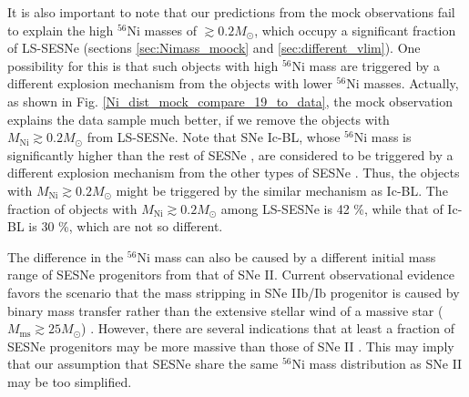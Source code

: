 \documentclass[twocolumn, linenumbers]{aastex62}
\begin{document}
It is also important to note that our predictions from the mock observations fail to explain the high $^{56}$Ni masses of $\gtrsim 0.2 M_{\odot}$, which occupy a significant fraction of LS-SESNe (sections \ref{sec:Nimass_moock} and \ref{sec:different_vlim}).
One possibility for this is that such objects with high $^{56}$Ni mass are triggered by a different explosion mechanism from the objects with lower $^{56}$Ni masses. Actually, as shown in Fig. \ref{Ni_dist_mock_compare_19_to_data}, the mock observation explains the data sample much better, if we remove the objects with $M_{\mathrm{Ni}} \gtrsim 0.2M_{\odot}$ from LS-SESNe. Note that SNe Ic-BL, whose $^{56}$Ni mass is significantly higher than the rest of SESNe \citep{2019A&A...628A...7A}, are considered to be triggered by a different explosion mechanism from the other types of SESNe \citep{2012ApJ...750...68L, 2018ApJ...860...38B}. Thus, the objects with $M_{\mathrm{Ni}} \gtrsim 0.2 M_{\odot}$ might be triggered by the similar mechanism as Ic-BL. The fraction of objects with $M_{\mathrm{Ni}} \gtrsim 0.2 M_{\odot}$ among LS-SESNe is 42 \%, while that of Ic-BL is 30 \%, which are not so different.

The difference in the $^{56}$Ni mass can also be caused by a different initial mass range of SESNe progenitors from that of SNe II. Current observational evidence favors the scenario that the mass stripping in SNe IIb/Ib progenitor is caused by binary mass transfer rather than the extensive stellar wind of a massive star ($M_{\mathrm{ms}} \gtrsim 25 M_{\odot}$) \citep{1994ApJ...429..300W, 2013ApJ...762...74B, 2015ApJ...811..147F}. However, there are several indications that at least a fraction of SESNe progenitors may be more massive than those of SNe II \citep[e.g.][]{2012MNRAS.424.1372A, 2018MNRAS.476.2629M, 2019NatAs...3..434F}. This may imply that our assumption that SESNe share the same $^{56}$Ni mass distribution as SNe II may be too simplified.

\end{document}

